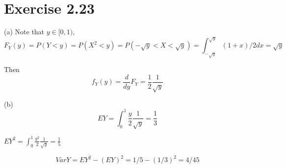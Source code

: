 \documentclass[12pt]{article}
\begin{document}
\section*{Exercise 2.23}
(a) Note that $y \in [0, 1)$, $$F_Y(y) = P(Y < y) = P(X^2 < y) = P(-\sqrt{y} < X < \sqrt{y}) = \int^{\sqrt{y}}_{-\sqrt{y}} (1+x)/2 dx = \sqrt{y}$$

Then $$f_Y(y) = \frac{d}{dy}F_Y = \frac{1}{2}\frac{1}{\sqrt{y}}$$

(b) $$EY = \int^{1}_{0} \frac{y}{2}\frac{1}{\sqrt{y}} = \frac{1}{3}$$

$EY^2 = \int^1_0 \frac{y^2}{2} \frac{1}{\sqrt{y}} = \frac{1}{5}$

$$VarY = EY^2 - (EY)^2 = 1/5 - (1/3)^2 = 4/45 $$
\end{document}

